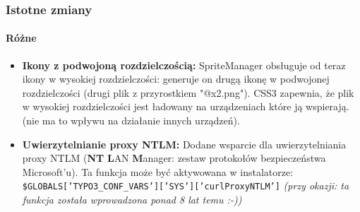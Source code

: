 \begin{frame}[fragile]
	\frametitle{Istotne zmiany}
	\framesubtitle{Różne}

	\begin{itemize}

		\item \textbf{Ikony z podwojoną rozdzielczością:}\newline
			\small
				SpriteManager obsługuje od teraz ikony w wysokiej rozdzielczości: generuje on drugą ikonę w podwojonej rozdzielczości (drugi plik z  przyrostkiem "@x2.png"). CSS3 zapewnia, że plik w wysokiej rozdzielczości jest ładowany na urządzeniach które ją wspierają. (nie ma to wpływu na działanie innych urządzeń).
			\normalsize

		\item \textbf{Uwierzytelnianie proxy NTLM:}\newline
			\small
				Dodane wsparcie dla uwierzytelniania proxy NTLM (\textbf{NT} \textbf{L}AN \textbf{M}anager: zestaw protokołów bezpieczeństwa Microsoft'u). Ta funkcja może być aktywowana w instalatorze:\newline
			\normalsize
			\smaller
				\texttt{\$GLOBALS['TYPO3\_CONF\_VARS']['SYS']['curlProxyNTLM']}\newline
				\emph{(przy okazji: ta funkcja została wprowadzona ponad 8 lat temu :-))}
			\normalsize

	\end{itemize}
	
\end{frame}


